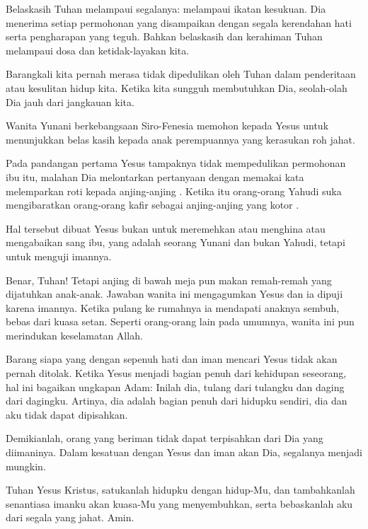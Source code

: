 \documentclass[a4paper,12pt]{article}
\begin{document}
Belaskasih Tuhan melampaui segalanya: melampaui ikatan kesukuan. Dia menerima setiap permohonan yang disampaikan dengan segala kerendahan hati serta pengharapan yang teguh. Bahkan belaskasih dan kerahiman Tuhan melampaui dosa dan ketidak-layakan kita.

Barangkali kita pernah merasa tidak dipedulikan oleh Tuhan dalam penderitaan atau kesulitan hidup kita. Ketika kita sungguh membutuhkan Dia, seolah-olah Dia jauh dari jangkauan kita.

Wanita Yunani berkebangsaan Siro-Fenesia memohon kepada Yesus untuk menunjukkan belas kasih kepada anak perempuannya yang kerasukan roh jahat.

Pada pandangan pertama Yesus tampaknya tidak mempedulikan permohonan ibu itu, malahan Dia melontarkan pertanyaan dengan memakai kata   melemparkan roti kepada anjing-anjing  . Ketika itu orang-orang Yahudi suka mengibaratkan orang-orang kafir sebagai   anjing-anjing yang kotor .

Hal tersebut dibuat Yesus bukan untuk meremehkan atau menghina atau mengabaikan sang ibu, yang adalah seorang Yunani dan bukan Yahudi, tetapi untuk menguji imannya.

  Benar, Tuhan! Tetapi anjing di bawah meja pun makan remah-remah yang dijatuhkan anak-anak.   Jawaban wanita ini mengagumkan Yesus dan ia dipuji karena imannya. Ketika pulang ke rumahnya ia mendapati anaknya sembuh, bebas dari kuasa setan. Seperti orang-orang lain pada umumnya, wanita ini pun merindukan keselamatan Allah.

Barang siapa yang dengan sepenuh hati dan iman mencari Yesus tidak akan pernah ditolak. Ketika Yesus menjadi bagian penuh dari kehidupan seseorang, hal ini bagaikan ungkapan Adam:   Inilah dia, tulang dari tulangku dan daging dari dagingku.   Artinya, dia adalah bagian penuh dari hidupku sendiri, dia dan aku tidak dapat dipisahkan.

Demikianlah, orang yang beriman tidak dapat terpisahkan dari Dia yang diimaninya. Dalam kesatuan dengan Yesus dan iman akan Dia, segalanya menjadi mungkin.

Tuhan Yesus Kristus, satukanlah hidupku dengan hidup-Mu, dan tambahkanlah senantiasa imanku akan kuasa-Mu yang menyembuhkan, serta bebaskanlah aku dari segala yang jahat. Amin.
	
\end{document}
